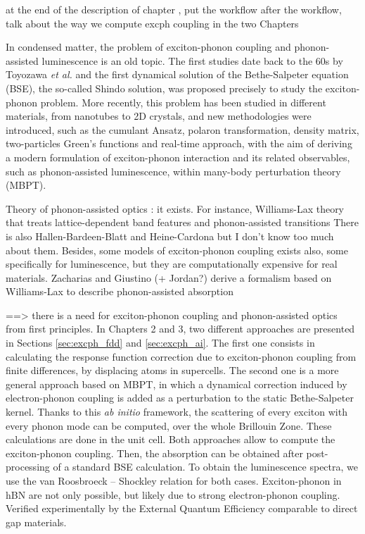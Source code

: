 at the end of the description of chapter , put the workflow
after the workflow, talk about the way we compute excph coupling in the two Chapters

In condensed matter, the problem of exciton-phonon coupling and phonon-assisted luminescence is an old topic. The first studies date back to the 60s by Toyozawa \emph{et al.}\cite{toyozawa2003optical,toyozawa1964interband} and the first dynamical solution of the Bethe-Salpeter equation (BSE), the so-called Shindo solution, was proposed precisely to study the exciton-phonon problem.\cite{shindo1970effective}
More recently, this problem has been studied in different materials, from nanotubes\cite{perebeinos} to 2D crystals, and new methodologies were introduced, such as the cumulant Ansatz\cite{cudazzo2020first}, polaron transformation,\cite{feldtmann2009phonon} density matrix,\cite{brem2020phonon} two-particles Green's functions\cite{antonius2017theory} and real-time approach,\cite{paleari2022coupling} with the aim of deriving a modern formulation of exciton-phonon interaction and its related observables, such as phonon-assisted luminescence, within many-body perturbation theory (MBPT).

Theory of phonon-assisted optics : it exists. For instance, Williams-Lax theory that treats lattice-dependent band features and phonon-assisted transitions 
There is also Hallen-Bardeen-Blatt and Heine-Cardona but I don't know too much about them.
Besides, some models of exciton-phonon coupling exists also, some specifically for luminescence, but they are computationally expensive for real materials.
Zacharias and Giustino (+ Jordan?) derive a formalism based on Williams-Lax to describe phonon-assisted absorption 

==> there is a need for exciton-phonon coupling and phonon-assisted optics from first principles. In Chapters 2 and 3, two different approaches are presented in Sections \ref{sec:excph_fdd} and \ref{sec:excph_ai}. The first one consists in calculating the response function correction due to exciton-phonon coupling from finite differences, by displacing atoms in supercells. The second one is a more general approach based on \acrshort{MBPT}, in which a dynamical correction induced by electron-phonon coupling is added as a perturbation to the static Bethe-Salpeter kernel. Thanks to this \textit{ab initio} framework, the scattering of every exciton with every phonon mode can be computed, over the whole Brillouin Zone. These calculations are done in the unit cell.
Both approaches allow to compute the exciton-phonon coupling. Then, the absorption can be obtained after post-processing of a standard \acrshort{BSE} calculation. To obtain the luminescence spectra, we use the van Roosbroeck -- Shockley relation for both cases.
Exciton-phonon in hBN are not only possible, but likely due to strong electron-phonon coupling. Verified experimentally by the External Quantum Efficiency comparable to direct gap materials.\\


